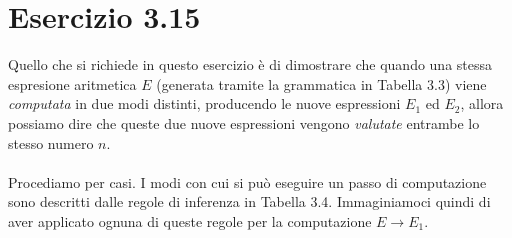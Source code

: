 \section*{Esercizio 3.15}

    
    Quello che si richiede in questo esercizio è di dimostrare che quando una stessa espresione aritmetica $E$ (generata tramite la grammatica in Tabella 3.3) viene \textit{computata} in due modi distinti, producendo le nuove espressioni $E_1$ ed $E_2$, allora possiamo dire che queste due nuove espressioni vengono \textit{valutate} entrambe lo stesso numero $n$.\\
    \\
    Procediamo per casi. I modi con cui si può eseguire un passo di computazione sono descritti dalle regole di inferenza in Tabella 3.4. Immaginiamoci quindi di aver applicato ognuna di queste regole per la computazione $E \rightarrow E_1$.
    
